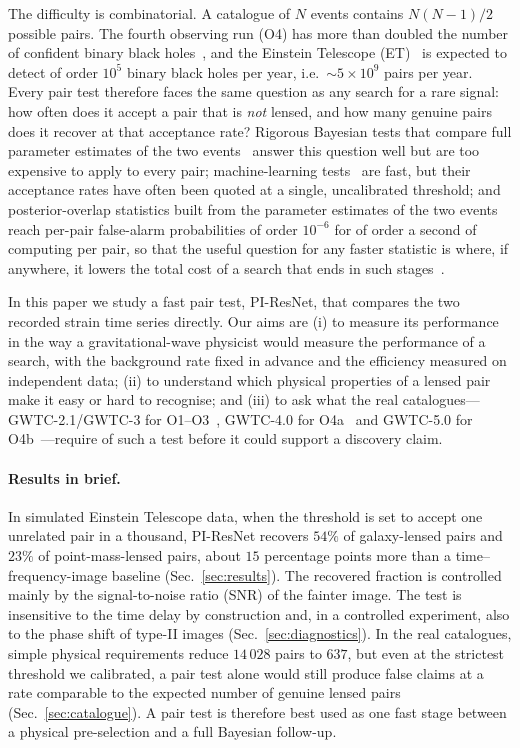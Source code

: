 \documentclass[aps,prd,twocolumn,superscriptaddress,nofootinbib,floatfix]{revtex4-2}
\newcommand{\PIR}{PI-ResNet}
\begin{document}
The difficulty is combinatorial.
A catalogue of $N$ events contains $N(N-1)/2$ possible pairs.
The fourth observing run (O4) has more than doubled the number of confident binary black holes~\cite{GWTC4,GWTC5}, and the Einstein Telescope (ET)~\cite{Punturo2010,Maggiore2020,Branchesi2023} is expected to detect of order $10^5$ binary black holes per year, i.e.\ $\sim 5\times10^{9}$ pairs per year.
Every pair test therefore faces the same question as any search for a rare signal: how often does it accept a pair that is \emph{not} lensed, and how many genuine pairs does it recover at that acceptance rate?
Rigorous Bayesian tests that compare full parameter estimates of the two events~\cite{Haris2018,LoHernandez2023,Janquart2021GOLUM} answer this question well but are too expensive to apply to every pair; machine-learning tests~\cite{Goyal2021,Offermans2024,Li2025SEMD} are fast, but their acceptance rates have often been quoted at a single, uncalibrated threshold; and posterior-overlap statistics built from the parameter estimates of the two events~\cite{Barsode2024,Barsode2026} reach per-pair false-alarm probabilities of order $10^{-6}$ for of order a second of computing per pair, so that the useful question for any faster statistic is where, if anywhere, it lowers the total cost of a search that ends in such stages~\cite{LensingFlow2025,LVKO4lensing}.

In this paper we study a fast pair test, \PIR{}, that compares the two recorded strain time series directly.
Our aims are (i) to measure its performance in the way a gravitational-wave physicist would measure the performance of a search, with the background rate fixed in advance and the efficiency measured on independent data; (ii) to understand which physical properties of a lensed pair make it easy or hard to recognise; and (iii) to ask what the real catalogues---GWTC-2.1/GWTC-3 for O1--O3~\cite{GWTC21,GWTC3}, GWTC-4.0 for O4a~\cite{GWTC4} and GWTC-5.0 for O4b~\cite{GWTC5}---require of such a test before it could support a discovery claim.

\paragraph*{Results in brief.}
In simulated Einstein Telescope data, when the threshold is set to accept one unrelated pair in a thousand, \PIR{} recovers $54\%$ of galaxy-lensed pairs and $23\%$ of point-mass-lensed pairs, about $15$ percentage points more than a time--frequency-image baseline (Sec.~\ref{sec:results}).
The recovered fraction is controlled mainly by the signal-to-noise ratio (SNR) of the fainter image.
The test is insensitive to the time delay by construction and, in a controlled experiment, also to the phase shift of type-II images (Sec.~\ref{sec:diagnostics}).
In the real catalogues, simple physical requirements reduce $14\,028$ pairs to $637$, but even at the strictest threshold we calibrated, a pair test alone would still produce false claims at a rate comparable to the expected number of genuine lensed pairs (Sec.~\ref{sec:catalogue}).
A pair test is therefore best used as one fast stage between a physical pre-selection and a full Bayesian follow-up.
\end{document}
